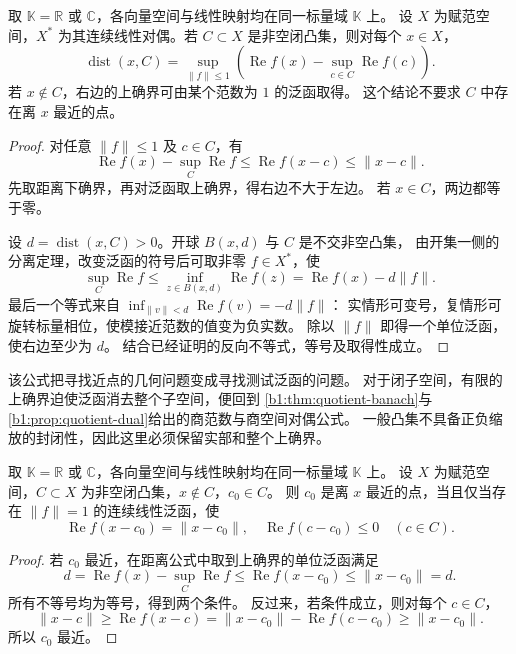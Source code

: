 \begin{theorem}\label{b1:thm:C1-distance-dual}
取 \(\mathbb K=\mathbb R\) 或 \(\mathbb C\)，各向量空间与线性映射均在同一标量域 \(\mathbb K\) 上。
设 \(X\) 为赋范空间，\(X^*\) 为其连续线性对偶。若 \(C\subset X\) 是非空闭凸集，则对每个 \(x\in X\)，
\[
 \operatorname{dist}(x,C)=
 \sup_{\|f\|\leq1}
 \left(\operatorname{Re}f(x)-\sup_{c\in C}\operatorname{Re}f(c)\right).
\]
若 \(x\notin C\)，右边的上确界可由某个范数为 \(1\) 的泛函取得。
这个结论不要求 \(C\) 中存在离 \(x\) 最近的点。
\end{theorem}
\begin{proof}
对任意 \(\|f\|\leq1\) 及 \(c\in C\)，有
\[
 \operatorname{Re}f(x)-\sup_C\operatorname{Re}f
 \leq \operatorname{Re}f(x-c)\leq\|x-c\|.
\]
先取距离下确界，再对泛函取上确界，得右边不大于左边。
若 \(x\in C\)，两边都等于零。

设 \(d=\operatorname{dist}(x,C)>0\)。开球 \(B(x,d)\) 与 \(C\) 是不交非空凸集，
由开集一侧的分离定理，改变泛函的符号后可取非零 \(f\in X^*\)，使
\[
 \sup_C\operatorname{Re}f\leq
 \inf_{z\in B(x,d)}\operatorname{Re}f(z)
 =\operatorname{Re}f(x)-d\|f\|.
\]
最后一个等式来自
\(\inf_{\|v\|<d}\operatorname{Re}f(v)=-d\|f\|\)：
实情形可变号，复情形可旋转标量相位，使模接近范数的值变为负实数。
除以 \(\|f\|\) 即得一个单位泛函，使右边至少为 \(d\)。
结合已经证明的反向不等式，等号及取得性成立。
\end{proof}

该公式把寻找近点的几何问题变成寻找测试泛函的问题。
对于闭子空间，有限的上确界迫使泛函消去整个子空间，便回到%
\cref{b1:thm:quotient-banach}与\cref{b1:prop:quotient-dual}给出的商范数与商空间对偶公式。
一般凸集不具备正负缩放的封闭性，因此这里必须保留实部和整个上确界。

\begin{corollary}\label{b1:cor:C1-best-approximation}
取 \(\mathbb K=\mathbb R\) 或 \(\mathbb C\)，各向量空间与线性映射均在同一标量域 \(\mathbb K\) 上。
设 \(X\) 为赋范空间，\(C\subset X\) 为非空闭凸集，\(x\notin C\)，\(c_0\in C\)。
则 \(c_0\) 是离 \(x\) 最近的点，当且仅当存在 \(\|f\|=1\) 的连续线性泛函，使
\[
 \operatorname{Re}f(x-c_0)=\|x-c_0\|,\quad
 \operatorname{Re}f(c-c_0)\leq0\quad(c\in C).
\]
\end{corollary}
\begin{proof}
若 \(c_0\) 最近，在距离公式中取到上确界的单位泛函满足
\[
 d=\operatorname{Re}f(x)-\sup_C\operatorname{Re}f
 \leq\operatorname{Re}f(x-c_0)\leq\|x-c_0\|=d.
\]
所有不等号均为等号，得到两个条件。
反过来，若条件成立，则对每个 \(c\in C\)，
\[
 \|x-c\|\geq\operatorname{Re}f(x-c)
 =\|x-c_0\|-\operatorname{Re}f(c-c_0)\geq\|x-c_0\|.
\]
所以 \(c_0\) 最近。
\end{proof}

